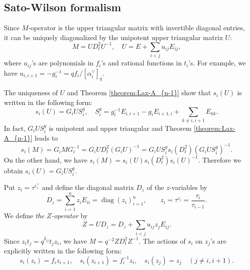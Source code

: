 \documentclass[12pt,twoside]{article}
\newcommand\av{\alpha^\vee}
\newcommand\eps{\varepsilon}
\newcommand\epsv{\eps^\vee}
\newcommand\diag{\mathop{\mathrm{diag}}\nolimits}
\theoremstyle{plain} %
\theoremstyle{definition} %
\theoremstyle{definition} %
\numberwithin{theorem}{section}
\numberwithin{equation}{section}
\numberwithin{figure}{section}
\numberwithin{table}{section}
\newcommand\theoremref[1]{Theorem \ref{#1}}
\begin{document}

\subsection{Sato-Wilson formalism}
\label{sec:SW-A_{n-1}}

Since $M$-operator is the upper triangular matrix with
invertible diagonal entries, 
it can be uniquely diagonalized 
by the unipotent upper triangular matrix $U$:
\begin{equation*}
 M = U D_t^2 U^{-1}, \quad
 U = E + \sum_{i<j} u_{ij} E_{ij},
\end{equation*}
where $u_{ij}$'s are polynomials in $f_i$'s and
rational functions in $t_i$'s. 
For example, we have $u_{i,i+1} = - g_i^{-1} = qf_i/[\av_i]_q$. 

The uniqueness of $U$ and \theoremref{theorem:Lax-A_{n-1}} show that
$s_i(U)$ is written in the following form:
\begin{equation}
 s_i(U) = G_i U S_i^g, \quad
 S_i^g = g_i^{-1} E_{i,i+1} - g_i E_{i+1,i} + \sum_{k\ne i,i+1} E_{kk}.
 \label{eq:s_i(U)}
\end{equation}
In fact, $G_i U S_i^g$ is unipotent and upper triangular 
and \theoremref{theorem:Lax-A_{n-1}} leads to
\begin{equation*}
 s_i(M) 
 = G_i M G_i^{-1}
 = G_i U D_t^2 (G_i U)^{-1}
 = G_i U S_i^g s_i(D_t^2) (G_i U S_i^g)^{-1}.
\end{equation*}
On the other hand, we have $s_i(M)=s_i(U)s_i(D_t^2)s_i(U)^{-1}$.
Therefore we obtain $s_i(U)=G_i U S_i^g$.

Put $z_i = \tau^{\epsv_i}$ and define the diagonal matrix $D_z$ 
of the $z$-variables by
\begin{equation*}
 D_z = \sum_{i=1}^n z_i E_{ii} = \diag(z_i)_{i=1}^n,
 \qquad z_i = \tau^{\eps_i} = \frac{\tau_i}{\tau_{i-1}}.
\end{equation*}
We define {\em the $Z$-operator} by
\begin{equation*}
 Z = U D_z = D_z + \sum_{i<j} u_{ij}z_j E_{ij}.
\end{equation*}
Since $z_i t_j = q^{\delta_{ij}} t_j z_i$, 
we have $M = q^{-2} Z D_t^2 Z^{-1}$. 
The actions of $s_i$ on $z_j$'s are explicitly written in the following form:
\begin{equation*}
 s_i(z_i)= f_i z_{i+1}, \quad
 s_i(z_{i+1}) = f_i^{-1} z_i, \quad
 s_i(z_j) = z_j \quad (j\ne i,i+1).
\end{equation*}
\end{document}
